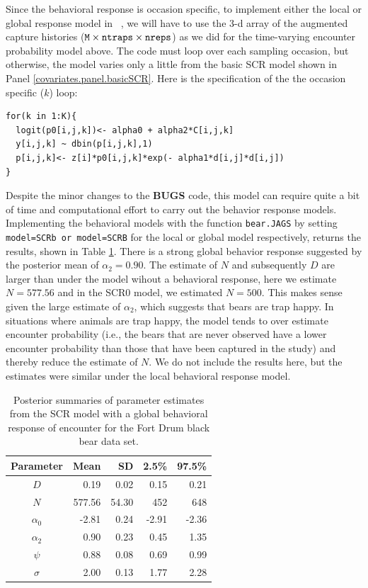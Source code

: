 Since the behavioral response is occasion specific, to implement either the local or global 
response model in \jags~, we will have to use the 3-d array of the augmented
capture histories ($\mbox{\tt M} \times \mbox{\tt ntraps} \times
\mbox{\tt nreps}$) as we did for the time-varying encounter probability
model above. The code must loop over each sampling occasion, but otherwise, the model
varies only a little from the basic SCR model shown in Panel \ref{covariates.panel.basicSCR}.  
Here is the specification of the the occasion specific ($k$) loop:

{\small
\begin{verbatim}
for(k in 1:K){
  logit(p0[i,j,k])<- alpha0 + alpha2*C[i,j,k]
  y[i,j,k] ~ dbin(p[i,j,k],1)
  p[i,j,k]<- z[i]*p0[i,j,k]*exp(- alpha1*d[i,j]*d[i,j])
}
\end{verbatim}
}

Despite the minor changes to the {\bf BUGS} code, this model can require quite a 
bit of time and computational 
effort to carry out the behavior response models.  Implementing the behavioral 
models with the function {\tt bear.JAGS} by setting {\tt
model=SCRb or model=SCRB} for the local or global model respectively, 
returns the results, shown in Table \ref{covariates.tab.SCRb}.  
There is a strong
global behavior response suggested by the posterior mean of $\alpha_2 = 0.90$.  
The estimate of $N$ and subsequently $D$ are larger 
than under the model wihout a behavioral response, here we estimate $N = 577.56$ and in 
the SCR0 model, we estimated $N = 500$. 
This makes sense given the large estimate of $\alpha_2$, which suggests that bears
are trap happy.  In situations where animals are trap happy, 
the model tends to over estimate encounter probability
 (i.e., the bears that are 
never observed have a lower encounter 
probability than those that 
have been captured in the study) and thereby reduce the 
estimate of $N$.  We do not include the results here, but 
the estimates were similar under the local behavioral response
model.  

\begin{table}[ht]
\centering
\caption{Posterior summaries of parameter estimates from the SCR model with a 
global behavioral response of encounter for the Fort Drum black bear data set.}
\begin{tabular}{crrrr}
\hline \hline
Parameter & Mean & SD & 2.5\% & 97.5\% \\
\hline
$D$           &    0.19     &  0.02    & 0.15 & 0.21 \\
$N$           &   577.56 &  54.30  & 452  & 648  \\
$\alpha_0$  &    -2.81     & 0.24    & -2.91  & -2.36  \\
$\alpha_2$  & 0.90  &  0.23   & 0.45  &  1.35 \\
$\psi$  &   0.88 &  0.08  &  0.69 & 0.99  \\
$\sigma$ & 2.00 &  0.13  &   1.77 & 2.28  \\ \hline
\end{tabular}
\label{covariates.tab.SCRb}
\end{table}


